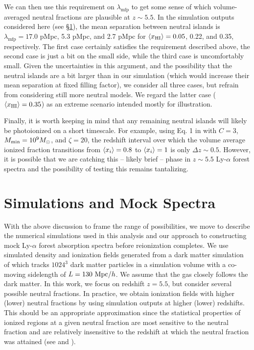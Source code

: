 We can then use this requirement on $\lambda_{\text{mfp}}$ to get some sense of which volume-averaged neutral fractions are plausible at $z \sim 5.5$. In the simulation outputs considered here (see \S\ref{sec:Sims}), the 
mean separation between neutral islands is $\lambda_{\text{mfp}} = 17.0$ pMpc, 5.3 pMpc, and 2.7 pMpc for $\langle x_{\text{HI}}\rangle = 0.05$, 0.22, and 0.35, respectively. The first case certainly satisfies
the requirement described above, the second case is just a bit on the small side, while the third case is uncomfortably small. Given the uncertainties in this argument, and the possibility that the neutral
islands are a bit larger than in our simulation (which would increase their mean separation at fixed filling factor), we consider all three cases, but refrain from considering still more neutral models. We regard the latter case ($\langle x_{\text{HI}}\rangle = 0.35$) as an extreme scenario intended mostly for illustration. 

 
Finally, it is worth keeping in mind that any remaining neutral islands will likely be photoionized on a short timescale. For example, using Eq. 1 in \citet{Lidz:2014jxa} with $C=3$, $M_{\rm min} = 10^9 M_\odot$, and
$\zeta = 20$, the redshift interval over which the volume average ionized fraction transitions from $\langle x_i \rangle = 0.8$ to $\langle x_i \rangle=1$ is only $\Delta z \sim 0.5$. 
However, it is possible that we
are catching this -- likely brief -- phase in $z \sim 5.5$ Ly-$\alpha$ forest
spectra and the possibility of testing this remains tantalizing.


\section{Simulations and Mock Spectra} \label{sec:Sims}


With the above discussion to frame the range of possibilities, we move to describe the numerical simulations used in this analysis and our approach to constructing mock Ly-$\alpha$ forest
absorption spectra before reionization completes. We use simulated density and ionization fields generated from a dark matter simulation of \cite{McQuinn:2007dy} which tracks $1024^{3}$ dark matter particles in a simulation volume with a co-moving sidelength of $L = 130\ \text{Mpc/$h$}$. We assume that the gas closely follows the dark matter. In this work, we focus on redshift $z = 5.5$, but consider several possible neutral fractions. In practice, we obtain ionization fields with higher (lower) neutral fractions by using simulation outputs at higher (lower) redshifts. This should be an appropriate approximation since the statistical properties of ionized regions at a given neutral fraction are most sensitive to the neutral fraction and are relatively insensitive to the redshift at which the neutral fraction was attained (see \citealt{McQuinn:2006et} and \citealt{Furlanetto:2004nh}).
 
